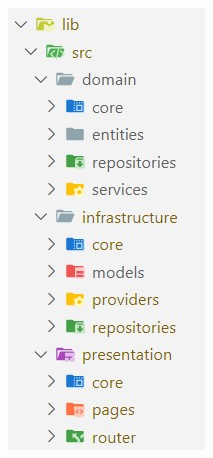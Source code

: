 \documentclass{article}
\begin{document}
\begin{figure}[H]
  \centering
  \begin{minipage}[b]{0.4\textwidth}
    \centering
    \includegraphics[width=\textwidth]{images/clean_arq_code_structure.jpg}

\end{minipage}
\end{figure}
\end{document}
